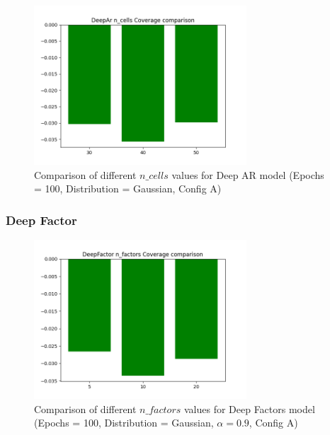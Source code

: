 \begin{figure}[H]
    \centering
    \includegraphics[width=300px]{plots/hist/a/DeepAr/n_cells/Coverage.png}
    \caption{Comparison of different $n\_cells$ values for Deep AR model (Epochs = 100, Distribution = Gaussian, Config A)}
    \label{fig:comp2_deepar_n_cells}
\end{figure}

\subsubsection{Deep Factor} \label{comp2_deepfactor}

\begin{figure}[H]
    \centering
    \includegraphics[width=300px]{plots/hist/a/DeepFactor/n_factors/Coverage.png}
    \caption{Comparison of different $n\_factors$ values for Deep Factors model (Epochs = 100, Distribution = Gaussian, $\alpha = 0.9$, Config A)}
    \label{fig:comp2_deepfactor_n_factors}
\end{figure}


